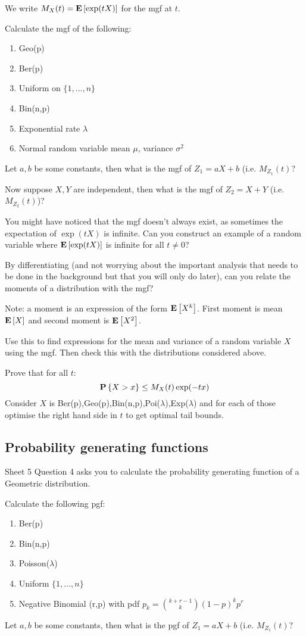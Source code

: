 \documentclass{article}
\begin{document}
We write $M_X(t)={\mathbf E}\left[\exp(tX)\right]$ for the mgf at $t$.

Calculate the mgf of the following:
\begin{enumerate}
    \item Geo(p)
    \item Ber(p)
    \item Uniform on $\{1,...,n\}$
    \item Bin(n,p)
    \item Exponential rate $\lambda$
    \item Normal random variable mean $\mu$, variance $\sigma^2$
\end{enumerate}
Let $a,b$ be some constants, then what is the mgf of $Z_1=aX+b$ (i.e. $M_{Z_1}(t)$?

Now suppose $X,Y$ are independent, then what is the mgf of $Z_2=X+Y$ (i.e. $M_{Z_2}(t)$)?

You might have noticed that the mgf doesn't always exist, as sometimes the expectation of $\exp(tX)$ is infinite. 
Can you construct an example of a random variable where ${\mathbf E}\left[\exp(tX)\right]$ is infinite for all $t\neq0$?

By differentiating (and not worrying about the important analysis that needs to be done in the background but that you will only do later), can you relate the moments of a distribution with the mgf?

Note: a moment is an expression of the form ${\mathbf E}\left[X^k\right]$.
First moment is mean ${\mathbf E}\left[X\right]$ and second moment is ${\mathbf E}\left[X^2\right]$.

Use this to find expressions for the mean and variance of a random variable $X$ using the mgf.
Then check this with the distributions considered above.

Prove that for all $t$:
\begin{equation*}
    {\mathbf P}\left\{X>x\right\}\leq M_X(t)\exp(-tx)
\end{equation*}
Consider $X$ is Ber(p),Geo(p),Bin(n,p),Poi($\lambda$),Exp($\lambda$) and for each of those optimise the right hand side in $t$ to get optimal tail bounds.
\subsection{Probability generating functions}
Sheet 5 Question 4 asks you to calculate the probability generating function of a Geometric distribution.

Calculate the following pgf:
\begin{enumerate}
    \item Ber(p)
    \item Bin(n,p)
    \item Poisson($\lambda$)
    \item Uniform $\{1,...,n\}$
    \item Negative Binomial (r,p) with pdf $p_k={k+r-1 \choose k}(1-p)^kp^r$
\end{enumerate}
Let $a,b$ be some constants, then what is the pgf of $Z_1=aX+b$ (i.e. $M_{Z_1}(t)$?
\end{document}
